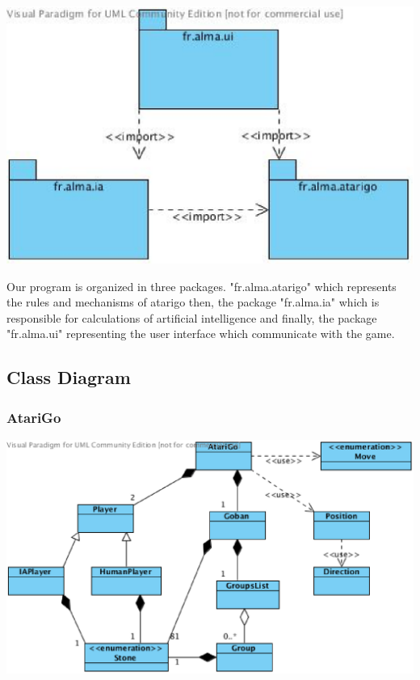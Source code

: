 \documentclass[11pt,a4paper]{report}
\begin{document}
\begin{center}
	\includegraphics[scale=0.70]{package_diag}
\end{center}

    Our program is organized in three packages. "fr.alma.atarigo" which represents the rules and mechanisms of atarigo then, the package "fr.alma.ia" which is responsible for calculations of artificial intelligence and finally, the package "fr.alma.ui" representing the user interface which communicate with the game.

\subsection{Class Diagram}

\subsubsection{AtariGo}

\begin{center}
	\includegraphics[scale=0.70]{class_diag}
\end{center}
\end{document}
